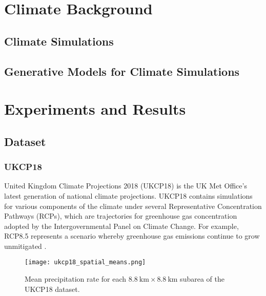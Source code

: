 \documentclass[ oneside,%
                    author={George Herbert},
                    degree={MSci},
                     title={Video Diffusion Models for Climate Simulations},
                  subtitle={}]{dissertation}
\begin{document}
\chapter{Climate Background}
\label{chap:background_climate}

\section{Climate Simulations}
\label{sec:background_climate_simulations}

\section{Generative Models for Climate Simulations}
\label{sec:background_climate_generative}


\chapter{Experiments and Results}
\label{chap:results}

\section{Dataset}
\label{sec:results_dataset}

\subsection{UKCP18}
\label{sec:results_dataset_ukcp18}

United Kingdom Climate Projections 2018 (UKCP18) \cite{MO_UKCP18_Dataset} is the UK Met Office's latest generation of national climate projections. UKCP18 contains simulations for various components of the climate under several Representative Concentration Pathways (RCPs), which are trajectories for greenhouse gas concentration adopted by the Intergovernmental Panel on Climate Change. For example, RCP8.5 represents a scenario whereby greenhouse gas emissions continue to grow unmitigated \cite{MO_RCP_Guidance}.

\begin{figure}[htbp]
      \centering
      \texttt{[image: ukcp18\_spatial\_means.png]}
      \caption{Mean precipitation rate for each $8.8\ \mathrm{km}\times 8.8\ \mathrm{km}$ subarea of the UKCP18 dataset.}
      \label{fig:ukcp18_spatial_means}
\end{figure}
\end{document}
